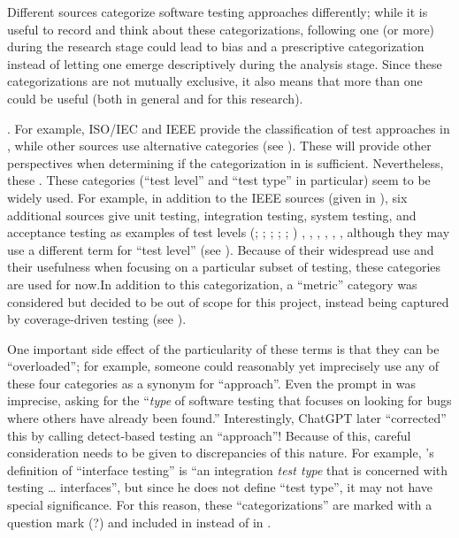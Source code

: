 Different sources categorize software testing approaches differently\ifnotpaper;
while it is useful to record and think about these categorizations, following
one (or more) during the research
stage could lead to bias and a prescriptive categorization instead of letting
one emerge descriptively during the analysis stage. Since these categorizations
are not mutually exclusive, it also means that more than one could be useful
(both in general and for this research).\par \citet{IEEE2022} \else. For
example, ISO/IEC and IEEE \cite{IEEE2022} \fi provide the classification of test
approaches in \ifnotpaper, while other sources
\citep{BarbosaEtAl2006, SouzaEtAl2017} use alternative categories (see
). These will provide other perspectives when
determining if the categorization in  is sufficient.
Nevertheless, these \else. These \fi categories (``test level'' and ``test
type'' in particular) seem to be widely used. For example, in addition to the
IEEE sources (given in ), six additional sources give
unit testing, integration testing, system testing, and acceptance testing as
examples of test levels \ifnotpaper
    (\citealp[pp.~5-6 to 5-7]{SWEBOK2024}; \citealpISTQB{};
    \citealp[p.~218]{KuļešovsEtAl2013};
    \citealp[p.~807-808]{Perry2006}; \citealp[pp.~443-445]{PetersAndPedrycz2000};
    \citealp[pp.~9,~13]{Gerrard2000a})\else
    \cite{ISTQB}, \cite[pp.~5-6 to 5-7]{SWEBOK2024},
    \cite[pp.~9,~13]{Gerrard2000a}, \cite[p.~807-808]{Perry2006},
    \cite[pp.~443-445]{PetersAndPedrycz2000}, \citealp[p.~218]{KuļešovsEtAl2013}%
    \fi, although they may use a different term for ``test
level'' (see ). Because of their widespread use and
their usefulness when focusing on a particular subset of testing, these
categories are used for now.\ifnotpaper In addition to this categorization, a
    ``metric'' category was considered but decided to be
    out of scope for this project, instead being captured by coverage-driven
    testing (see ). \fi

One important side effect of the particularity of these terms is that they can
be ``overloaded''; for example, someone could reasonably yet imprecisely use
any of these four categories as a synonym for ``approach''. Even the prompt in
\ifnotpaper \citep[emphasis added]{ChatGPT2024} \else \cite{ChatGPT2024} \fi was
imprecise, asking for the ``\emph{type} of software testing that focuses on
looking for bugs where others have already been found.'' Interestingly, ChatGPT
later ``corrected'' this by calling detect-based testing an ``approach''!
Because of this, careful consideration needs to be given to discrepancies of
this nature. For example, \citet[p.~45\ifnotpaper, emphasis added\fi]{Kam2008}'s
definition of ``interface testing'' is ``an integration \emph{test type} that is
concerned with testing \dots{} interfaces'', but since he does not define
``test type'', it may not have special significance. \ifnotpaper For this
reason, these ``categorizations'' are marked with a question mark (?)%
and included in  instead of in .

